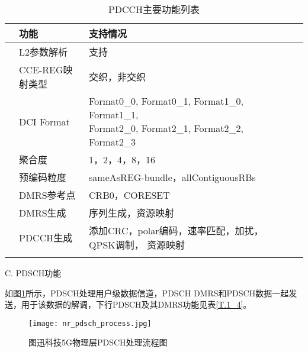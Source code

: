 \begin{table}[h]
  \centering
  \caption{PDCCH主要功能列表}
  \label{T.1_3}
  \begin{tabular}{llllll}
      \hline
        & 功能   & 支持情况 \\
      \hline
        & L2参数解析 & 支持 \\
      \hline
        & CCE-REG映射类型 & 交织，非交织 \\
      \hline
        & DCI Format & \makecell[l]{Format0\_0,  Format0\_1, Format1\_0, Format1\_1, \\ Format2\_0, Format2\_1, Format2\_2, Format2\_3}\\
      \hline
        & 聚合度 & 1，2，4，8，16 \\
      \hline
        & 预编码粒度 &  sameAsREG-bundle，allContiguousRBs \\
      \hline
        & DMRS参考点 &  CRB0，CORESET \\
      \hline
        & DMRS生成 &  序列生成，资源映射 \\
      \hline
        & PDCCH生成 &  添加CRC，polar编码，速率匹配，加扰，QPSK调制， 资源映射\\
      \hline{}
  \end{tabular}
\end{table}

C. PDSCH功能
\par
{} %
\setlength{\hangindent}{2em}
如图\ref{F.1_5}所示，PDSCH处理用户级数据信道，PDSCH DMRS和PDSCH数据一起发送，用于该数据的解调，下行PDSCH及其DMRS功能见表\ref{T.1_4}。

\begin{figure}[H]
  \centering
  \texttt{[image: nr\_pdsch\_process.jpg]}
  \caption{图迅科技5G物理层PDSCH处理流程图}
  \label{F.1_5}
\end{figure}

